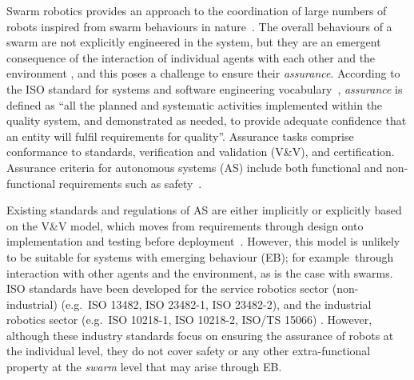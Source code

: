 \documentclass[runningheads]{llncs}
\begin{document}
Swarm robotics provides an approach to the coordination of large numbers of robots inspired from swarm behaviours in nature~\cite{Sahin2005}. 
The overall behaviours of a swarm are not explicitly engineered in the system, but they are an emergent consequence of the interaction of individual agents with each other and the environment \cite{Abeywickrama2022}, and this poses a challenge to ensure their \emph{assurance}. 
According to the ISO standard for systems and software engineering vocabulary~\cite{ISO24765:2017}, \emph{assurance} is defined as ``all the planned and systematic activities implemented within the quality system, and demonstrated as needed, to provide adequate confidence that an entity will fulfil requirements for quality''. 
Assurance tasks comprise conformance to standards, verification and validation (V\&V), and certification. Assurance criteria for autonomous systems (AS) include both functional and non-functional requirements such as safety~\cite{Cheng2014}. 

Existing standards and regulations of AS are either implicitly or explicitly based on the V\&V model, which moves from requirements through design onto implementation and testing before deployment~\cite{Jia2021,Fisher2020}. 
However, this model is unlikely to be suitable for systems with emerging behaviour (EB); for example\ through interaction with other agents and the environment, as is the case with swarms. 
ISO standards have been developed for the service robotics sector (non-industrial) (e.g.\ ISO 13482, ISO 23482-1, ISO 23482-2), and the industrial robotics sector (e.g.\ ISO 10218-1, ISO 10218-2, ISO/TS 15066) \cite{Abeywickrama2022}. 
However, although these industry standards focus on ensuring the assurance of robots at the individual level, they do not cover safety or any other extra-functional property at the \emph{swarm} level that may arise through EB. %
\end{document}
